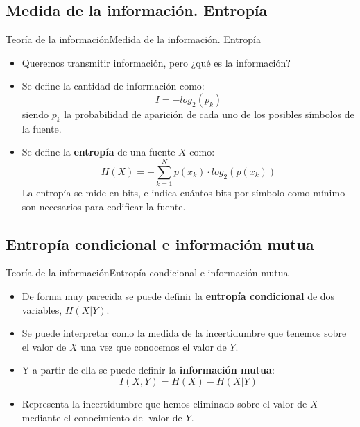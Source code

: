\documentclass[10pt,compress]{beamer} %
\begin{document}
\subsection{Medida de la información. Entropía}
\begin{frame}{Teoría de la información}{Medida de la información. Entropía}
    \begin{itemize}
    \item Queremos transmitir información, pero ¿qué es la información?
		\item Se define la cantidad de información como:
		\begin{displaymath}
        I = -log_2(p_k)
    \end{displaymath}
      siendo $p_k$ la probabilidad de aparición de cada uno de los posibles símbolos de la fuente. 
    
    \item Se define la {\bf entropía} de una fuente $X$ como:
    \begin{displaymath}
      H(X) = - \sum_{k=1}^{N}p(x_k) \cdot  log_2(p(x_k))
    \end{displaymath}
    La entropía se mide en bits, e indica cuántos bits por símbolo como mínimo son necesarios para codificar la fuente.
	\end{itemize}
\end{frame}

\subsection{Entropía condicional e información mutua}
\begin{frame}{Teoría de la información}{Entropía condicional e información mutua}
  \begin{itemize}
  \item De forma muy parecida se puede definir la {\bf entropía condicional} de dos variables, $H(X|Y)$.
  \item Se puede interpretar como la medida de la incertidumbre que tenemos sobre el valor de $X$ una vez que conocemos el valor de $Y$.
  \item Y a partir de ella se puede definir la {\bf información mutua}:
  \begin{displaymath}
    I(X,Y)= H(X) - H(X|Y)
  \end{displaymath}
  \item Representa la incertidumbre que hemos eliminado sobre el valor de $X$ mediante el conocimiento del valor de $Y$.
\end{itemize}
\end{frame}
\end{document}
